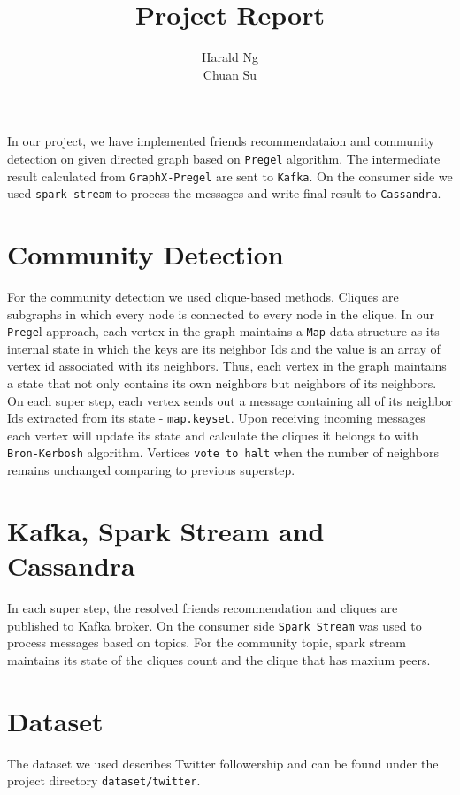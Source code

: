 \documentclass[12pt]{article}
\begin{document}
	
	\title{Project Report}
	\author{Harald Ng \\
		Chuan Su}
	
	\maketitle
In our project, we have implemented friends recommendataion and community detection on given directed graph based on \texttt{Pregel} algorithm. The intermediate result calculated from \texttt{GraphX-Pregel} are sent to \texttt{Kafka}. On the consumer side we used \texttt{spark-stream} to process the messages and write final result to \texttt{Cassandra}.
\section{Community Detection}
For the community detection we used clique-based methods. Cliques are subgraphs in which  every node is connected to every node in the clique. In our \texttt{Prege}l approach, each vertex in the graph maintains a \texttt{Map} data structure as its internal state in which the keys are its neighbor Ids and the value is an array of vertex id associated with its neighbors. Thus, each vertex in the graph maintains a state that not only contains its own neighbors but neighbors of its neighbors. 
On each super step, each vertex sends out a message containing all of its neighbor Ids extracted from its state - \texttt{map.keyset}. Upon receiving incoming messages each vertex will update its state and calculate the cliques it belongs to with \texttt{Bron-Kerbosh} algorithm. Vertices \texttt{vote to halt} when the number of neighbors remains unchanged comparing to previous superstep. 

\section{Kafka, Spark Stream and Cassandra}
In each super step, the resolved friends recommendation and cliques are published to Kafka broker. On the consumer side \texttt{Spark Stream} was used to process messages based on topics.
For the community topic, spark stream maintains its state of the cliques count and the clique that has maxium peers.

\section{Dataset}
The dataset we used describes Twitter followership and can be found under the project directory \texttt{dataset/twitter}.
\end{document}
